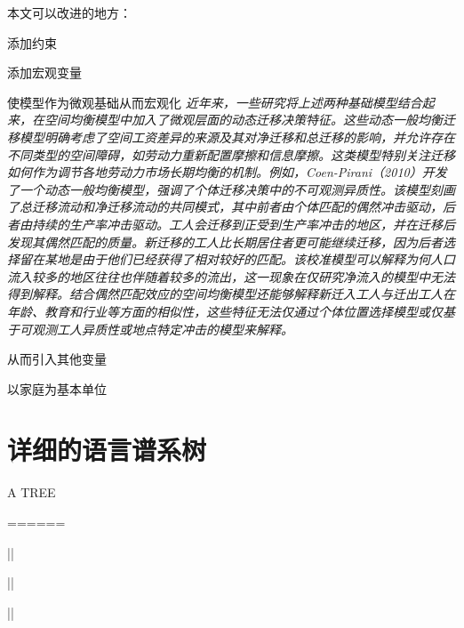 \documentclass[
  a4paper,
  zihao=-4,
  fontset=mac,
  AutoFakeBold,
  AutoFakeSlant,
  oneside]{ctexbook}
\begin{document}
本文可以改进的地方：

添加约束

添加宏观变量

使模型作为微观基础从而宏观化
\textit{近年来，一些研究将上述两种基础模型结合起来，在空间均衡模型中加入了微观层面的动态迁移决策特征。这些动态一般均衡迁移模型明确考虑了空间工资差异的来源及其对净迁移和总迁移的影响，并允许存在不同类型的空间障碍，如劳动力重新配置摩擦和信息摩擦。这类模型特别关注迁移如何作为调节各地劳动力市场长期均衡的机制。例如，Coen-Pirani（2010）开发了一个动态一般均衡模型，强调了个体迁移决策中的不可观测异质性。该模型刻画了总迁移流动和净迁移流动的共同模式，其中前者由个体匹配的偶然冲击驱动，后者由持续的生产率冲击驱动。工人会迁移到正受到生产率冲击的地区，并在迁移后发现其偶然匹配的质量。新迁移的工人比长期居住者更可能继续迁移，因为后者选择留在某地是由于他们已经获得了相对较好的匹配。该校准模型可以解释为何人口流入较多的地区往往也伴随着较多的流出，这一现象在仅研究净流入的模型中无法得到解释。结合偶然匹配效应的空间均衡模型还能够解释新迁入工人与迁出工人在年龄、教育和行业等方面的相似性，这些特征无法仅通过个体位置选择模型或仅基于可观测工人异质性或地点特定冲击的模型来解释。}

从而引入其他变量

以家庭为基本单位


\newpage
\appendix

\chapter{详细的语言谱系树}

A TREE

======

      ||
      
      ||
      
      ||

\newpage
%
%
%
\printbibliography[heading=bibliography,title=参考文献]
\end{document}
